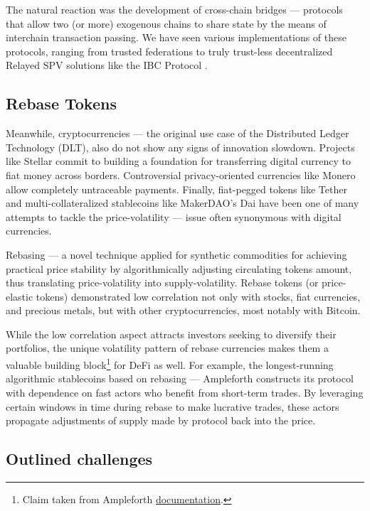 \documentclass{article}
\begin{document}
The natural reaction was the development of cross-chain bridges --- protocols that allow two (or more) exogenous chains to share state by the means of interchain transaction passing. We have seen various implementations of these protocols, ranging from trusted federations to truly trust-less decentralized Relayed SPV solutions like the IBC Protocol \cite{goes2020ibc}.

\subsection{Rebase Tokens}

Meanwhile, cryptocurrencies --- the original use case of the Distributed Ledger Technology (DLT), also do not show any signs of innovation slowdown. Projects like Stellar \cite{mazieres2016stellar} commit to building a foundation for transferring digital currency to fiat money across borders. Controversial privacy-oriented currencies like Monero allow completely untraceable payments. Finally, fiat-pegged tokens like Tether and multi-collateralized stablecoins like MakerDAO's Dai have been one of many attempts to tackle the price-volatility --- issue often synonymous with digital currencies.

Rebasing --- a novel technique applied for synthetic commodities for achieving practical price stability by algorithmically adjusting circulating tokens amount, thus translating price-volatility into supply-volatility. Rebase tokens (or price-elastic tokens) demonstrated low correlation not only with stocks, fiat currencies, and precious metals, but with other cryptocurrencies, most notably with Bitcoin.

While the low correlation aspect attracts investors seeking to diversify their portfolios, the unique volatility pattern of rebase currencies makes them a valuable building block\footnote{Claim taken from Ampleforth \href{https://ampleforth.org/economics}{documentation}.} for DeFi as well. For example, the longest-running algorithmic stablecoins based on rebasing --- Ampleforth \cite{kuo2019ampleforth} constructs its protocol with dependence on fast actors who benefit from short-term trades. By leveraging certain windows in time during rebase to make lucrative trades, these actors propagate adjustments of supply made by protocol back into the price.

\subsection{Outlined challenges}
\end{document}
